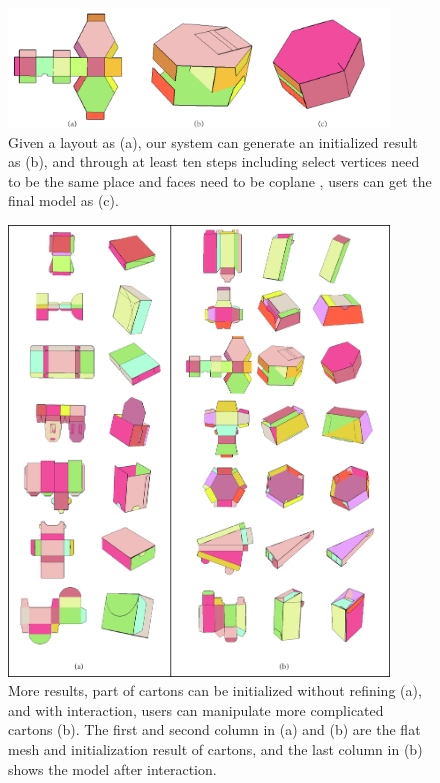 \begin{figure}
	\centering
	\includegraphics[width=0.9\textwidth]{images/limitation.jpg}
	\caption{Given a layout as (a), our system can generate an initialized result as (b), and through at least ten steps including select vertices need to be the same place and faces need to be coplane , users can get the final model as (c).}
	\label{fig:limitation}
\end{figure}

\begin{figure}
	\centering
	\includegraphics[width=0.9\textwidth]{images/more.jpg}
	\caption{More results, part of cartons can be initialized without refining (a), and with interaction, users can manipulate more complicated cartons (b). The first and second column in (a) and (b) are the flat mesh and initialization result of cartons, and the last column in (b) shows the model after interaction.}
	\label{fig:more}
\end{figure}